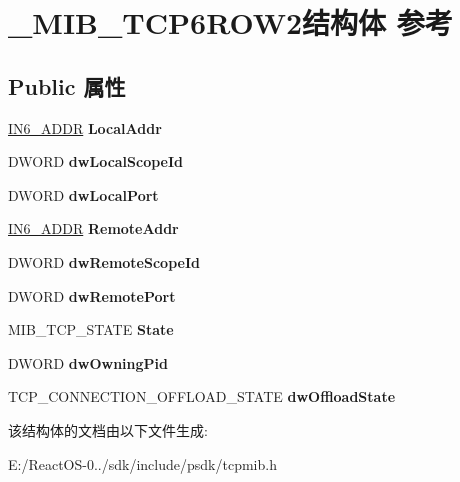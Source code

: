 \hypertarget{struct___m_i_b___t_c_p6_r_o_w2}{}\section{\+\_\+\+M\+I\+B\+\_\+\+T\+C\+P6\+R\+O\+W2结构体 参考}
\label{struct___m_i_b___t_c_p6_r_o_w2}
\subsection*{Public 属性}
\begin{DoxyCompactItemize}
\item 
\mbox{\label{struct___m_i_b___t_c_p6_r_o_w2_acebd7ad0da0106180ed281bd1b41bfa2}} 
\hyperlink{structin6__addr}{I\+N6\+\_\+\+A\+D\+DR} {\bfseries Local\+Addr}
\item 
\mbox{\label{struct___m_i_b___t_c_p6_r_o_w2_a4a5a79da2c46736af7a10d3439fce322}} 
D\+W\+O\+RD {\bfseries dw\+Local\+Scope\+Id}
\item 
\mbox{\label{struct___m_i_b___t_c_p6_r_o_w2_a800e5f588273a6a2938bc902ce4d8361}} 
D\+W\+O\+RD {\bfseries dw\+Local\+Port}
\item 
\mbox{\label{struct___m_i_b___t_c_p6_r_o_w2_aa171e4d7483b3f47e92fe48abc537119}} 
\hyperlink{structin6__addr}{I\+N6\+\_\+\+A\+D\+DR} {\bfseries Remote\+Addr}
\item 
\mbox{\label{struct___m_i_b___t_c_p6_r_o_w2_a4571e6a8ab41fba088bd647aed1db58a}} 
D\+W\+O\+RD {\bfseries dw\+Remote\+Scope\+Id}
\item 
\mbox{\label{struct___m_i_b___t_c_p6_r_o_w2_abb5c1fb2aefa68ce67a2c0e55e50ce4b}} 
D\+W\+O\+RD {\bfseries dw\+Remote\+Port}
\item 
\mbox{\label{struct___m_i_b___t_c_p6_r_o_w2_a8dc69a158216c96dc097726a30c78fea}} 
M\+I\+B\+\_\+\+T\+C\+P\+\_\+\+S\+T\+A\+TE {\bfseries State}
\item 
\mbox{\label{struct___m_i_b___t_c_p6_r_o_w2_a1dff78b8b5532d7e48cc48a2b5782b8d}} 
D\+W\+O\+RD {\bfseries dw\+Owning\+Pid}
\item 
\mbox{\label{struct___m_i_b___t_c_p6_r_o_w2_a7cdc91b34f892101e5f333cd695666c9}} 
T\+C\+P\+\_\+\+C\+O\+N\+N\+E\+C\+T\+I\+O\+N\+\_\+\+O\+F\+F\+L\+O\+A\+D\+\_\+\+S\+T\+A\+TE {\bfseries dw\+Offload\+State}
\end{DoxyCompactItemize}


该结构体的文档由以下文件生成\+:\begin{DoxyCompactItemize}
\item 
E\+:/\+React\+O\+S-\/0../sdk/include/psdk/tcpmib.\+h\end{DoxyCompactItemize}

